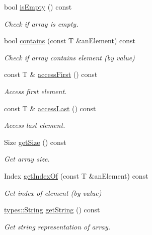 \begin{DoxyCompactItemize}
bool \hyperlink{classlibrary_1_1core_1_1ctnr_1_1_array_a77d943be46a6d0313be3f2c5ca66d231}{is\+Empty} () const
\begin{DoxyCompactList}\small\item\em Check if array is empty. \end{DoxyCompactList}\item 
bool \hyperlink{classlibrary_1_1core_1_1ctnr_1_1_array_a9c423eb8a34dddc81e0ede9435094e99}{contains} (const T \&an\+Element) const
\begin{DoxyCompactList}\small\item\em Check if array contains element (by value) \end{DoxyCompactList}\item 
const T \& \hyperlink{classlibrary_1_1core_1_1ctnr_1_1_array_afea012716d6cfffa2803606c0b244419}{access\+First} () const
\begin{DoxyCompactList}\small\item\em Access first element. \end{DoxyCompactList}\item 
const T \& \hyperlink{classlibrary_1_1core_1_1ctnr_1_1_array_ad95dcce8ddaf163903a2327f766dbc8a}{access\+Last} () const
\begin{DoxyCompactList}\small\item\em Access last element. \end{DoxyCompactList}\item 
Size \hyperlink{classlibrary_1_1core_1_1ctnr_1_1_array_a049307129c77f461b37ddca47edc7913}{get\+Size} () const
\begin{DoxyCompactList}\small\item\em Get array size. \end{DoxyCompactList}\item 
Index \hyperlink{classlibrary_1_1core_1_1ctnr_1_1_array_aa8a3e2745d72db8181b42e3cfb55415c}{get\+Index\+Of} (const T \&an\+Element) const
\begin{DoxyCompactList}\small\item\em Get index of element (by value) \end{DoxyCompactList}\item 
\hyperlink{classlibrary_1_1core_1_1types_1_1_string}{types\+::\+String} \hyperlink{classlibrary_1_1core_1_1ctnr_1_1_array_a6a3416cc26d2968239af631d946ba11b}{get\+String} () const
\begin{DoxyCompactList}\small\item\em Get string representation of array. \end{DoxyCompactList}\item 

\end{DoxyCompactItemize}
